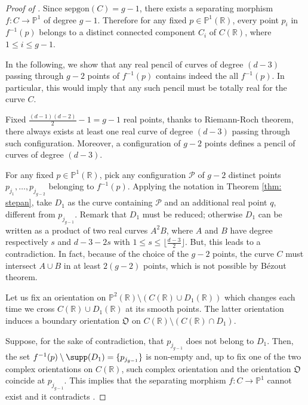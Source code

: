 \begin{proof}[Proof of ] 

	Since $\text{sepgon}(C)=g-1$, there exists a separating morphism $f: C \rightarrow \mathbb P^1$ of degree $g-1$. Therefore for any fixed $p \in \mathbb P^1(\mathbb R)$, every point $p_i$ in $f^{-1}(p)$ belongs to a distinct connected component $C_i$ of $C(\mathbb R)$, where $1 \leq i \leq g-1$. 
	
In the following, we show that any real pencil of curves of degree $(d-3)$ passing through $g-2$ points of $f^{-1}(p)$ contains indeed  the all $f^{-1}(p)$. In particular, this would imply that any such pencil must be totally real for the curve $C$. 

	
	Fixed $\frac{(d-1)(d-2)}{2}-1 = g-1$ real points, thanks to Riemann-Roch theorem, there always exists at least one real curve of degree $(d-3)$ passing through such configuration. Moreover, a configuration of $g-2$ points defines a pencil of curves of degree $(d-3)$. 
	
	
For any fixed $p \in \mathbb P^1(\mathbb R)$, pick any configuration $\mathcal P$ of $g-2$ distinct points $p_{j_1},\dots, p_{j_{g-2}}$ belonging to $f^{-1}(p)$. Applying the notation in Theorem \ref{thm: stepan}, take $D_1$ as the curve containing $\mathcal P$ and an additional real point $q$, different from $p_{j_{g-1}}$. Remark that $D_1$ must be reduced; otherwise $D_1$ can be written as a product of two real curves $A^2B$, where $A$ and $B$ have degree respectively $s$ and $d-3-2s$ with $1 \leq s \leq \lfloor \frac{d-3}{2} \rfloor$. But, this leads to a contradiction. In fact, because of the choice of the $g-2$ points, the curve $C$ must intersect $A \cup B$ in at least $2(g-2)$ points, which is not possible by B\'ezout theorem. 

Let us fix an orientation on $\mathbb P^2(\mathbb R) \setminus ( C(\mathbb R) \cup D_1(\mathbb R))$ which changes each time we cross $ C(\mathbb R) \cup D_1(\mathbb R)$ at its smooth points. The latter orientation induces a boundary orientation $\mathfrak O$ on $C(\mathbb R) \setminus ( C(\mathbb R) \cap D_1)$.

Suppose, for the sake of contradiction, that $p_{j_{g-1}}$ does not belong to $D_1$. Then, the set $f^{-1}(p) \setminus \supp(D_1)= \{p_{j_{g-1}}\}$ is non-empty and, up to fix one of the two complex orientations on $ C(\mathbb R)$, such complex orientation and the orientation $\mathfrak O$ coincide at $p_{j_{g-1}}$. This implies that the separating morphism $f: C \rightarrow \mathbb P^1$ cannot exist and it contradicts \cite[Theorem 7.1]{Gaba06}.


\end{proof}
